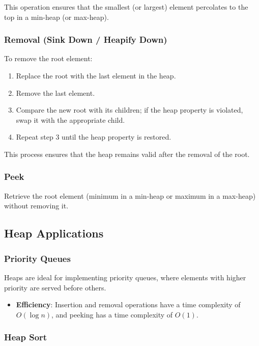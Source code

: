 This operation ensures that the smallest (or largest) element percolates to the top in a min-heap (or max-heap).

\subsubsection{Removal (Sink Down / Heapify Down)}

To remove the root element:

\begin{enumerate}
    \item Replace the root with the last element in the heap.
    \item Remove the last element.
    \item Compare the new root with its children; if the heap property is violated, swap it with the appropriate child.
    \item Repeat step 3 until the heap property is restored.
\end{enumerate}

This process ensures that the heap remains valid after the removal of the root.

\subsubsection{Peek}

Retrieve the root element (minimum in a min-heap or maximum in a max-heap) without removing it.

\subsection{Heap Applications}

\subsubsection{Priority Queues}

Heaps are ideal for implementing priority queues, where elements with higher priority are served before others.

\begin{itemize}
    \item \textbf{Efficiency}: Insertion and removal operations have a time complexity of $O(\log n)$, and peeking has a time complexity of $O(1)$.
\end{itemize}

\subsubsection{Heap Sort}

